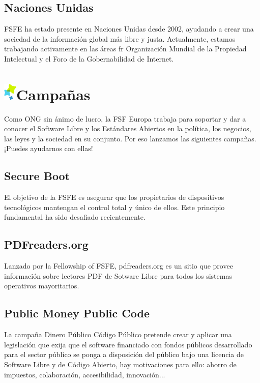 \documentclass[10pt,foldmark,tumble]{leaflet}
\begin{document}
\subsection{Naciones Unidas}

    FSFE ha estado presente en Naciones Unidas desde 2002, ayudando a crear una sociedad de la información global más libre y justa. Actualmente, estamos trabajando activamente en las áreas fr Organización Mundial de la Propiedad Intelectual y el Foro de la Gobernabilidad de Internet.

\section{\includegraphics{item.png}Campañas}

Como ONG sin ánimo de lucro, la FSF Europa trabaja para soportar y dar a conocer el Software Libre y los Estándares Abiertos en la política, los negocios, las leyes y la sociedad en su conjunto. Por eso lanzamos las siguientes campañas. ¡Puedes ayudarnos con ellas!

\subsection{Secure Boot}

    El objetivo de la FSFE es asegurar que los propietarios de dispositivos tecnológicos mantengan el control total y único de ellos. Este principio fundamental ha sido desafiado recientemente.

\subsection{PDFreaders.org}

    Lanzado por la Fellowship of FSFE, pdfreaders.org es un sitio que provee información sobre lectores PDF de Sotware Libre para todos los sistemas operativos mayoritarios.
    
\subsection{Public Money Public Code}

    La campaña Dinero Público Código Público pretende crear y aplicar una legislación que exija que el software financiado con fondos públicos desarrollado para el sector público se ponga a disposición del público bajo una licencia de Software Libre y de Código Abierto, hay motivaciones para ello: ahorro de impuestos, colaboración, accesibilidad, innovación...
    
\end{document}

